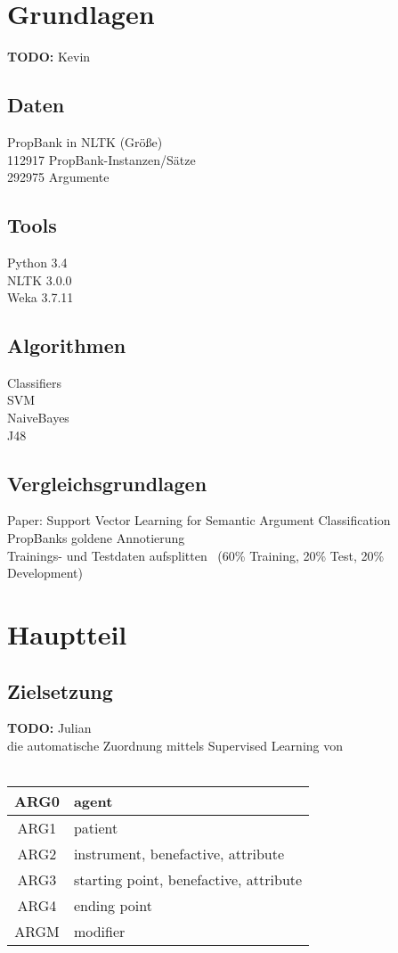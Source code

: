 \documentclass[runningheads]{llncs}
\begin{document}
\section{Grundlagen}
\textbf{TODO:} Kevin
\subsection{Daten}
PropBank in NLTK (Gr\"o\ss{}e)\\
112917 PropBank-Instanzen/S\"atze\\
292975 Argumente
\subsection{Tools}
Python 3.4\\
NLTK 3.0.0\\
Weka 3.7.11
\subsection{Algorithmen}
Classifiers\\
SVM\\
NaiveBayes\\
J48
\subsection{Vergleichsgrundlagen}
Paper: Support Vector Learning for Semantic Argument Classiﬁcation\\
PropBanks goldene Annotierung\\
Trainings- und Testdaten aufsplitten ~(60\% Training, 20\% Test, 20\% Development) 

\section{Hauptteil}
\subsection{Zielsetzung}
\textbf{TODO:} Julian\\
die automatische Zuordnung mittels Supervised Learning von\\
\\
\begin{table}
\centering
\begin{tabular}{|c|l|}
\hline 
ARG0 & agent \\ 
\hline 
ARG1 & patient \\ 
\hline 
ARG2 & instrument, benefactive, attribute \\ 
\hline 
ARG3 & starting point, benefactive, attribute \\ 
\hline 
ARG4 & ending point \\ 
\hline 
ARGM & modifier \\ 
\hline 
\end{tabular}
\end{table}
 
\end{document}
